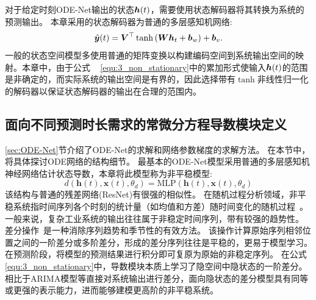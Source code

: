对于给定时刻ODE-Net输出的状态$\boldsymbol h(t)$，需要使用状态解码器将其转换为系统的预测输出。
本章采用的状态解码器为普通的多层感知机网络:
\begin{equation}
    \hat{\boldsymbol y}(t) = \boldsymbol{V}^{\top} \tanh \left(\boldsymbol{W}\boldsymbol{h}_{t}+\boldsymbol{b}_{w}\right)+\boldsymbol b_{v}.
\end{equation}
一般的状态空间模型多使用普通的矩阵变换以构建编码空间到系统输出空间的映射。本章中，由于公式
~ \eqref{equ:3_non_stationary}中的累加形式使输入$\boldsymbol h(t)$的范围是非确定的，而实际系统的输出空间是有界的，因此选择带有$\tanh$非线性归一化的解码器以保证状态解码器的输出在合理的范围内。



\subsection{面向不同预测时长需求的常微分方程导数模块定义}
\label{sec:derivative}
\ref{sec:ODE-Net}节介绍了ODE-Net的求解和网络参数梯度的求解方法。
在本节中，将具体探讨ODE网络的结构细节。
最基本的ODE-Net模型采用普通的多层感知机神经网络估计状态导数\cite{chen2018neural}，本章将此模型称为非平稳模型:
\begin{equation}
\label{equ:3_non_stationary}
d\left(\boldsymbol{h}(t), \boldsymbol{x}(t), \theta_{d}\right)=\text{MLP}\left(\boldsymbol{h}(t), \boldsymbol{x}(t), \theta_{d}\right)
\end{equation}
该结构与普通的残差网络(ResNet)有很强的相似性。
在随机过程分析领域，非平稳系统指时间序列各个时刻的统计量（如均值和方差）随时间变化的随机过程~\cite{GUIDOLIN2018113}。
一般来说，复杂工业系统的输出往往属于非稳定时间序列，带有较强的趋势性。
差分操作~\cite{christoffersen2001forecasting}是一种消除序列趋势和季节性的有效方法。
该操作计算原始序列相邻位置之间的一阶差分或多阶差分，形成的差分序列往往是平稳的，更易于模型学习。
在预测阶段，将模型的预测结果进行积分即可复原为原始的非稳定序列。
在公式\eqref{equ:3_non_stationary}中，导数模块本质上学习了隐空间中隐状态的一阶差分。
相比于ARIMA模型等直接对系统输出进行差分，面向隐状态的差分模型具有同等或更强的表示能力，进而能够建模更高阶的非平稳系统。

